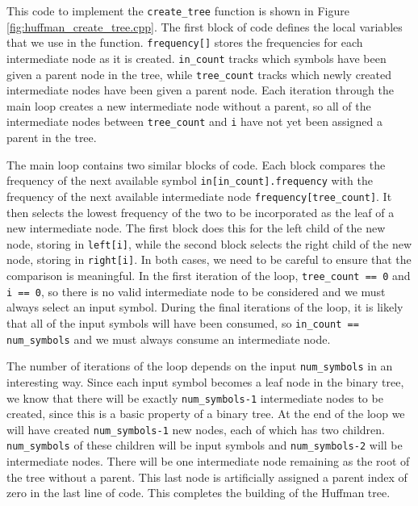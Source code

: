 This code to implement the \lstinline{create_tree} function is shown in Figure \ref{fig:huffman_create_tree.cpp}.  The first block of code defines the local variables that we use in the function.  \lstinline{frequency[]} stores the frequencies for each intermediate node as it is created.   \lstinline{in_count} tracks which symbols have been given a parent node in the tree, while \lstinline{tree_count} tracks which newly created intermediate nodes have been given a parent node.  Each iteration through the main loop creates a new intermediate node without a parent, so all of the intermediate nodes between \lstinline{tree_count} and \lstinline{i} have not yet been assigned a parent in the tree.

The main loop contains two similar blocks of code.  Each block compares the frequency of the next available symbol \lstinline{in[in_count].frequency} with the frequency of the next available intermediate node \lstinline{frequency[tree_count]}.  It then selects the lowest frequency of the two to be incorporated as the leaf of a new intermediate node.  The first block does this for the left child of the new node, storing in \lstinline{left[i]}, while the second block selects the right child of the new node, storing in \lstinline{right[i]}.  In both cases, we need to be careful to ensure that the comparison is meaningful.  In the first iteration of the loop, \lstinline{tree_count == 0} and \lstinline{i == 0}, so there is no valid intermediate node to be considered and we must always select an input symbol.  During the final iterations of the loop, it is likely that all of the input symbols will have been consumed, so \lstinline{in_count == num_symbols} and we must always consume an intermediate node.

The number of iterations of the loop depends on the input \lstinline{num_symbols} in an interesting way.  Since each input symbol becomes a leaf node in the binary tree, we know that there will be exactly \lstinline{num_symbols-1} intermediate nodes to be created, since this is a basic property of a binary tree.  At the end of the loop we will have created \lstinline{num_symbols-1} new nodes, each of which has two children. \lstinline{num_symbols} of these children will be input symbols and \lstinline{num_symbols-2} will be intermediate nodes.  There will be one intermediate node remaining as the root of the tree without a parent.  This last node is artificially assigned a parent index of zero in the last line of code.  This completes the building of the Huffman tree.

